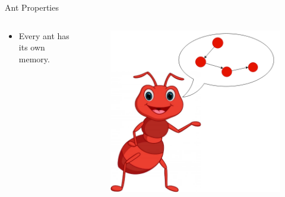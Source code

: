 \documentclass[table]{beamer}
\begin{document}
\begin{frame}{Ant Properties}
	
	\begin{columns}
		
		
		\begin{column}{0.4\textwidth}
			\begin{itemize}
				\item	Every ant has its own memory.
			\end{itemize}
		\end{column}
		
		\begin{column}{0.6\textwidth}
			\begin{figure}
				\centering
				\includegraphics[width=\textwidth ]{AntWithMemory.png}
			\end{figure}
		\end{column}
	\end{columns}
\end{frame}	
\end{document}
